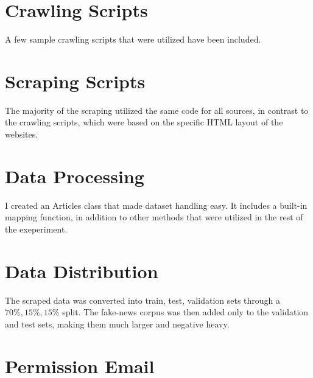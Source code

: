 \section{Crawling Scripts}
\label{appendix:crawling}
A few sample crawling scripts that were utilized have been included.


\section{Scraping Scripts}
\label{appendix:scraping}
The majority of the scraping utilized the same code for all sources, in contrast to the crawling scripts, which were based on the specific HTML layout of the websites.


\section{Data Processing}
\label{appendix:processing}
I created an Articles class that made dataset handling easy. It includes a built-in mapping function, in addition to other methods that were utilized in the rest of the exeperiment.


\section{Data Distribution}
\label{appendix:data-info}
The scraped data was converted into train, test, validation sets through a $70\%, 15\%, 15\%$ split. The fake-news corpus was then added only to the validation and test sets, making them much larger and negative heavy.


\section{Permission Email}
\label{appendix:permission}

